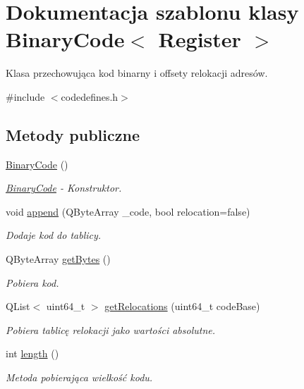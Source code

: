 \hypertarget{class_binary_code}{\section{Dokumentacja szablonu klasy Binary\-Code$<$ Register $>$}
\label{class_binary_code}
}


Klasa przechowująca kod binarny i offsety relokacji adresów.  




{\ttfamily \#include $<$codedefines.\-h$>$}

\subsection*{Metody publiczne}
\begin{DoxyCompactItemize}
\item 
\hyperlink{class_binary_code_aa21721fc16b2e943be048fa3ceea300d}{Binary\-Code} ()
\begin{DoxyCompactList}\small\item\em \hyperlink{class_binary_code}{Binary\-Code} -\/ Konstruktor. \end{DoxyCompactList}\item 
void \hyperlink{class_binary_code_a5f06f08736f891d6bc6d2d4fc93dca21}{append} (Q\-Byte\-Array \-\_\-code, bool relocation=false)
\begin{DoxyCompactList}\small\item\em Dodaje kod do tablicy. \end{DoxyCompactList}\item 
Q\-Byte\-Array \hyperlink{class_binary_code_a0b9f52a511f1ba6989412d4424885f8f}{get\-Bytes} ()
\begin{DoxyCompactList}\small\item\em Pobiera kod. \end{DoxyCompactList}\item 
Q\-List$<$ uint64\-\_\-t $>$ \hyperlink{class_binary_code_a16f19ea25857126aeaeb7993890a5ad3}{get\-Relocations} (uint64\-\_\-t code\-Base)
\begin{DoxyCompactList}\small\item\em Pobiera tablicę relokacji jako wartości absolutne. \end{DoxyCompactList}\item 
int \hyperlink{class_binary_code_a08ecf07ca01749c097929dc394871e6e}{length} ()
\begin{DoxyCompactList}\small\item\em Metoda pobierająca wielkość kodu. \end{DoxyCompactList}\end{DoxyCompactItemize}


